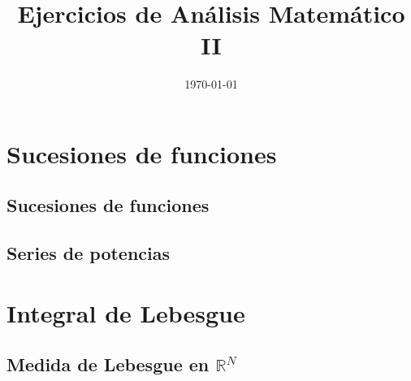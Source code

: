 \documentclass[11pt,spanish]{article} %
\title{Ejercicios de Análisis Matemático II}
\author{ }
\date{\today}
\begin{document}
\maketitle
\tableofcontents %
\newpage
\setlength\parindent{0pt} %

\section{Sucesiones de funciones}
\subsection{Sucesiones de funciones}
	
\subsection{Series de potencias}
	
\newpage
\section{Integral de Lebesgue}
\subsection{Medida de Lebesgue en $\mathbb{R}^N$}
	
	
	
\end{document}
